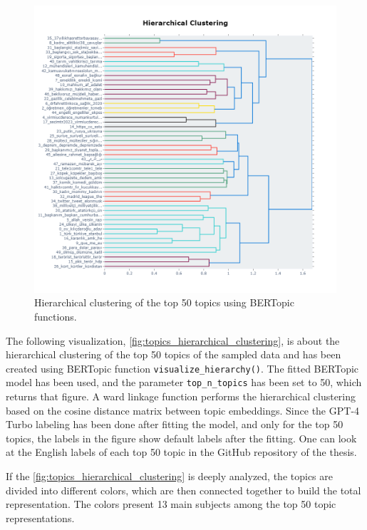 \begin{figure}[h!]
    \centering
    \includegraphics[width=\linewidth]{figures/Hierarchical_Clustering.png}
    \caption[Hierarchical Clustering]
    {Hierarchical clustering of the top 50 topics using BERTopic functions.}\label{fig:topics_hierarchical_clustering}
\end{figure}

The following visualization, \autoref{fig:topics_hierarchical_clustering}, is about the hierarchical 
clustering of the top 50 topics of the sampled data and has been created using BERTopic 
function \texttt{visualize\_hierarchy()}. The fitted BERTopic model has been used, and the 
parameter \texttt{top\_n\_topics} has been set to 50, which returns that figure. A ward linkage 
function performs the hierarchical clustering based on the cosine distance matrix between topic 
embeddings. Since the GPT-4 Turbo labeling has been done after fitting the model, and only 
for the top 50 topics, the labels in the figure show default labels after the fitting. 
One can look at the English labels of each top 50 topic in the GitHub repository of the thesis.

If the \autoref{fig:topics_hierarchical_clustering} is deeply analyzed, the topics are divided 
into different colors, which are then connected together to build the total representation. 
The colors present 13 main subjects among the top 50 topic representations.

